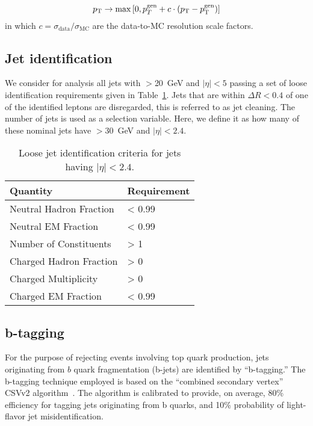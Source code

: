 \begin{equation}
p_{\rm T} \rightarrow \max \left[0 , p_{T}^{\rm gen} + c\cdot (p_{\rm T}-p_{\rm T}^{\rm gen}) \right]
\label{eq:jersmear}
\end{equation}
in which $c = \sigma_{\mathrm{data}} / \sigma_{\mathrm{MC}}$ are the data-to-MC resolution scale factors.

\subsection{Jet identification}

We consider for analysis all jets with \pt$>$20~GeV and $|\eta|<5$ passing a set of loose identification requirements given in Table~\ref{tab:loose_jet_id}.
Jets that are within $\Delta R < 0.4$ of one of the identified leptons are disregarded, this is referred to as jet cleaning.
The number of jets is used as a selection variable.
Here, we define it as how many of these nominal jets have \pt$>$30~GeV and $|\eta|<2.4$.
\begin{table}[htbp]
  \begin{center}
 {\small
  \begin{tabular} {ll}
\hline
  Quantity                  & Requirement \\
  \hline
    Neutral Hadron Fraction   & < 0.99      \\
    Neutral EM Fraction       & < 0.99      \\
    Number of Constituents    & > 1         \\
    Charged Hadron Fraction   & > 0         \\
    Charged Multiplicity      & > 0         \\
    Charged EM Fraction       & < 0.99      \\
  \hline
  \end{tabular}
}
  \caption{Loose jet identification criteria for jets having $|\eta|<2.4$. \label{tab:loose_jet_id}}
  \end{center}
\end{table}

\subsection{b-tagging}

For the purpose of rejecting events involving top quark production, jets originating from $b$ quark fragmentation (b-jets) are identified by ``b-tagging.''
The b-tagging technique employed is based on the ``combined secondary vertex'' CSVv2 algorithm~\cite{Chatrchyan:2012jua}.
The algorithm is calibrated to provide, on average, 80\% efficiency for tagging jets originating from b quarks,
and 10\% probability of light-flavor jet misidentification.

